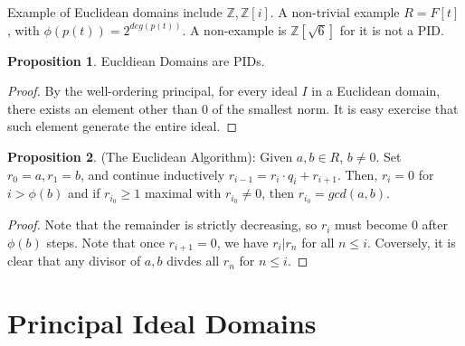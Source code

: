 \documentclass{article}
\theoremstyle{definition}
\theoremstyle{definition}
\theoremstyle{definition}
\newtheorem{proposition}{Proposition}[section]
\theoremstyle{definition}
\theoremstyle{definition}
\theoremstyle{definition}
\theoremstyle{definition}
\begin{document}
Example of Euclidean domains include $\mathbb Z,\mathbb Z[i]$. A non-trivial example $R=F[t]$, with $\phi(p(t))=2^{deg(p(t))}$. A non-example is $\mathbb Z[\sqrt{6}]$ for it is not a PID.



\begin{tcolorbox}[colback=blue!5!white,colframe=blue!30!white]
\begin{proposition}
    Eucldiean Domains are PIDs.
\end{proposition}
\end{tcolorbox}
\begin{proof}
    By the well-ordering principal, for every ideal $I$ in a Euclidean domain, there exists an element other than $0$ of the smallest norm. It is easy exercise that such element generate the entire ideal.
\end{proof}


\begin{tcolorbox}[colback=blue!5!white,colframe=blue!30!white]
\begin{proposition}
    (The Euclidean Algorithm): Given $a,b\in R$, $b\neq 0$. Set $r_0=a,r_1=b$, and continue inductively $r_{i-1}=r_i\cdot q_i+r_{i+1}$. Then, $r_i=0$ for $i>\phi(b)$ and if $r_{i_0}\geq 1$ maximal with $r_{i_0}\neq 0$, then $r_{i_0}=gcd(a,b)$.
\end{proposition}
\end{tcolorbox}
\begin{proof}
    Note that the remainder is strictly decreasing, so $r_i$ must become $0$ after $\phi(b)$ steps. Note that once $r_{i+1}=0$, we have $r_i|r_{n}$ for all $n\leq i$. Coversely, it is clear that any divisor of $a,b$ divdes all $r_n$ for $n\leq i$.
\end{proof}


\section{Principal Ideal Domains}
\end{document}
